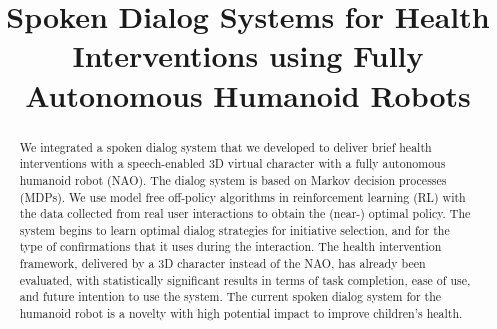 \documentclass[letterpaper]{article}
\begin{document}
%
\title{Spoken Dialog Systems for Health Interventions using Fully Autonomous Humanoid Robots}


\maketitle
\begin{abstract}
We integrated a spoken dialog system that we developed to deliver brief health interventions with a 
speech-enabled 3D virtual character with a fully autonomous humanoid robot (NAO). The dialog 
system is based on Markov decision processes (MDPs). We use model free off-policy algorithms in 
reinforcement learning (RL) with the data  collected from real user interactions to obtain the 
(near-) optimal policy. The system begins to learn optimal dialog strategies for initiative 
selection, and for the type of confirmations that it uses during the interaction. The health 
intervention framework, delivered by a 3D character instead of the NAO, has already been evaluated, 
with statistically significant results in terms of task completion, ease of use, and future 
intention to use the system.  The current spoken dialog system for the humanoid robot is a novelty with high potential impact to improve children's health.
\end{abstract}

\end{document}
